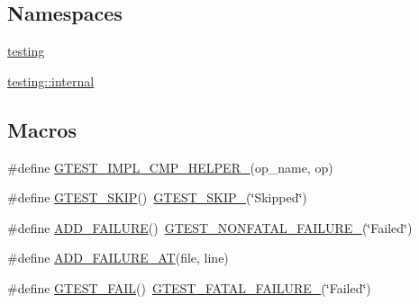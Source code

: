 \subsection*{Namespaces}
\begin{DoxyCompactItemize}
\item 
 \mbox{\hyperlink{namespacetesting}{testing}}
\item 
 \mbox{\hyperlink{namespacetesting_1_1internal}{testing\+::internal}}
\end{DoxyCompactItemize}
\subsection*{Macros}
\begin{DoxyCompactItemize}
\item 
\#define \mbox{\hyperlink{googletest-master_2googletest_2include_2gtest_2gtest_8h_a4a5b6fbde5dd05e05dd6846ac5e5c18e}{G\+T\+E\+S\+T\+\_\+\+I\+M\+P\+L\+\_\+\+C\+M\+P\+\_\+\+H\+E\+L\+P\+E\+R\+\_\+}}(op\+\_\+name,  op)
\item 
\#define \mbox{\hyperlink{googletest-master_2googletest_2include_2gtest_2gtest_8h_a3c0bbb980d533108ecc23c3534527d3c}{G\+T\+E\+S\+T\+\_\+\+S\+K\+IP}}()~\mbox{\hyperlink{_obj__test_2lib_2googletest-master_2googletest_2include_2gtest_2internal_2gtest-internal_8h_ab75ed7a6cd9e466944ce680c1c07ab47}{G\+T\+E\+S\+T\+\_\+\+S\+K\+I\+P\+\_\+}}(\char`\"{}Skipped\char`\"{})
\item 
\#define \mbox{\hyperlink{googletest-master_2googletest_2include_2gtest_2gtest_8h_adc16b5b0a740c39084ea5c9e960e3063}{A\+D\+D\+\_\+\+F\+A\+I\+L\+U\+RE}}()~\mbox{\hyperlink{_obj__test_2lib_2googletest-release-1_88_81_2googletest_2include_2gtest_2internal_2gtest-internal_8h_a6cb7482cfa03661a91c698eb5895f642}{G\+T\+E\+S\+T\+\_\+\+N\+O\+N\+F\+A\+T\+A\+L\+\_\+\+F\+A\+I\+L\+U\+R\+E\+\_\+}}(\char`\"{}Failed\char`\"{})
\item 
\#define \mbox{\hyperlink{googletest-master_2googletest_2include_2gtest_2gtest_8h_a448d7e5105b640e892fd8153fbee0b7f}{A\+D\+D\+\_\+\+F\+A\+I\+L\+U\+R\+E\+\_\+\+AT}}(file,  line)
\item 
\#define \mbox{\hyperlink{googletest-master_2googletest_2include_2gtest_2gtest_8h_a636231436707c30d6778f79ae96f5dc6}{G\+T\+E\+S\+T\+\_\+\+F\+A\+IL}}()~\mbox{\hyperlink{_obj__test_2lib_2googletest-release-1_88_81_2googletest_2include_2gtest_2internal_2gtest-internal_8h_a0f9a4c3ea82cc7bf4478eaffdc168358}{G\+T\+E\+S\+T\+\_\+\+F\+A\+T\+A\+L\+\_\+\+F\+A\+I\+L\+U\+R\+E\+\_\+}}(\char`\"{}Failed\char`\"{})
\item 

\end{DoxyCompactItemize}

